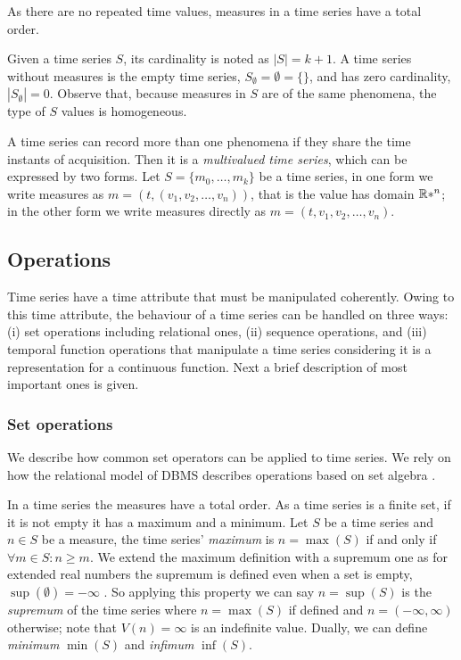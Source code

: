 As there are no repeated time values, measures in a time series have a
total order.

Given a time series $S$, its cardinality is noted as $|S|=k+1$.  A
time series without measures is the empty time series,
$S_\emptyset=\emptyset=\{\}$, and has zero cardinality,
$|S_\emptyset|=0$.  Observe that, because measures in $S$ are of the
same phenomena, the type of $S$ values is homogeneous.



A time series can record more than one phenomena if they share the
time instants of acquisition. Then it is a \emph{multivalued time
series}, which can be expressed by two forms. Let $S = \{m_0, \ldots,
m_k\}$ be a time series, in one form we write measures as
$m=(t,(v_1,v_2,\ldots,v_n))$, that is the value has domain $\mathbb{R}*^n$; in
the other form we write measures directly as
$m=(t,v_1,v_2,\ldots,v_n)$.




\subsection{Operations}

Time series have a time attribute that must be manipulated
coherently. Owing to this time attribute, the behaviour of a time
series can be handled on three ways: (i) set operations including
relational ones, (ii) sequence operations, and (iii) temporal function
operations that manipulate a time series considering it is a
representation for a continuous function. Next a brief description of
most important ones is given.



\subsubsection{Set operations}

We describe how common set operators can be applied to time series. We
rely on how the relational model of DBMS describes operations based on
set algebra \cite{date:introduction}.


In a time series the measures have a total order.  As a time series is
a finite set, if it is not empty it has a maximum and a minimum.  Let
$S$ be a time series and $n\in S$ be a measure, the time series'
\emph{maximum} is $n=\max(S)$ if and only if $\forall m \in S: n \geq
m $.  We extend the maximum definition with a supremum one as for
extended real numbers the supremum is defined even when a set is
empty, $\sup(\emptyset)=-\infty$ \cite{cantrell:extendedreal}. So
applying this property we can say $n=\sup(S)$ is the \emph{supremum}
of the time series where $n=\max(S)$ if defined and
$n=(-\infty,\infty)$ otherwise; note that $V(n)=\infty$ is an
indefinite value.  Dually, we can define \emph{minimum} $\min(S)$ and
\emph{infimum} $\inf(S)$.



